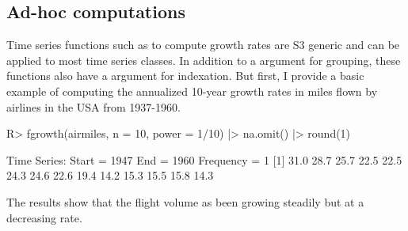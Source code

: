 \documentclass[nojss]{jss} %
\newcommand{\fct}[1]{\code{#1()}}
\begin{document}
\subsection{Ad-hoc computations}
%
Time series functions such as \fct{fgrowth} to compute growth rates are S3 generic and can be applied to most time series classes. In addition to a  argument for grouping, these functions also have a  argument for indexation. But first, I provide a basic example of computing the annualized 10-year growth rates in miles flown by airlines in the USA from 1937-1960.
%
\begin{Schunk}
\begin{Sinput}
R> fgrowth(airmiles, n = 10, power = 1/10) |> na.omit() |> round(1)
\end{Sinput}
\begin{Soutput}
Time Series:
Start = 1947 
End = 1960 
Frequency = 1 
 [1] 31.0 28.7 25.7 22.5 22.5 24.3 24.6 22.6 19.4 14.2 15.3 15.5 15.8 14.3
\end{Soutput}
\end{Schunk}
%
The results show that the flight volume as been growing steadily but at a decreasing rate. \newline
\end{document}
